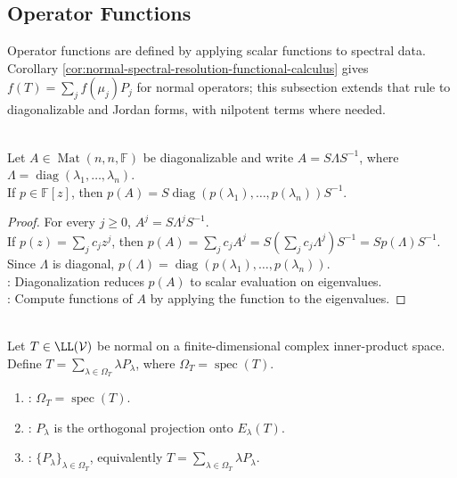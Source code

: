 \subsection{Operator Functions}


%

Operator functions are defined by applying scalar functions to spectral data.\\
Corollary \ref{cor:normal-spectral-resolution-functional-calculus} gives $f(T)=\sum_j f(\mu_j)P_j$ for normal operators; this subsection extends that rule to diagonalizable and Jordan forms, with nilpotent terms where needed.

\begin{theorem} \label{thm:polynomial-functional-calculus-diagonalizable-matrix} \\
Let $A\in\operatorname{Mat}(n,n,\mathbb{F})$ be diagonalizable and write $A=S\Lambda S^{-1}$, where $\Lambda=\operatorname{diag}(\lambda_1,\ldots,\lambda_n)$.\\
If $p\in\mathbb{F}[z]$, then $p(A)=S\operatorname{diag}(p(\lambda_1),\ldots,p(\lambda_n))S^{-1}$.
\begin{proof}
For every $j\geq0$, $A^j=S\Lambda^jS^{-1}$.\\
If $p(z)=\sum_j c_jz^j$, then $p(A)=\sum\limits_j c_jA^j =S\left(\sum\limits_j c_j\Lambda^j\right)S^{-1} =S p(\Lambda) S^{-1}$.\\
Since $\Lambda$ is diagonal, $p(\Lambda)=\operatorname{diag}(p(\lambda_1),\ldots,p(\lambda_n))$.\\
: Diagonalization reduces $p(A)$ to scalar evaluation on eigenvalues.\\
: Compute functions of $A$ by applying the function to the eigenvalues.
\end{proof}
\end{theorem}

\begin{definition} \label{def:normal-spectral-resolution-notation} \\
Let $T\in\LL(\mathcal{V})$ be normal on a finite-dimensional complex inner-product space.\\
Define $T=\sum\limits_{\lambda\in\Omega_T}\lambda P_{\lambda}$, where $\Omega_T=\operatorname{spec}(T)$.
\begin{enumerate}[label=(\roman*)]
\setlength{\itemsep}{0pt}
\item {}: $\Omega_T=\operatorname{spec}(T)$.
\item {}: $P_{\lambda}$ is the orthogonal projection onto $E_{\lambda}(T)$.
\item {}: $\{P_{\lambda}\}_{\lambda\in\Omega_T}$, equivalently $T=\sum\limits_{\lambda\in\Omega_T}\lambda P_{\lambda}$.
\end{enumerate}
\end{definition}

